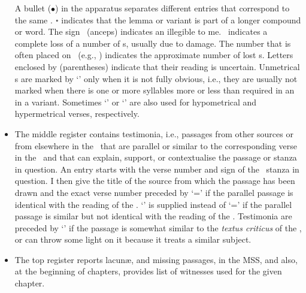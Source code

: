 \begin{itemize}
A bullet ($\bullet$) in the apparatus separates different entries that correspond to
the same .
{\devanagarifont ॰} indicates that the lemma or variant is part of a longer compound or word. 
The sign \lk\ (anceps) indicates an  illegible to me.
\lac\ indicates a complete loss of a number of s, usually due to damage.
The number that is often placed on \lac\ (e.g., ) indicates the approximate
number of lost s.
Letters enclosed by (parentheses) indicate that their reading is uncertain. 
Unmetrical s are marked by `\unmetr' only when it is not fully obvious,
i.e., they are usually not marked when there is one or more syllables more 
or less than required in an  in a variant.
Sometimes `\hypometr' or `\hypermetr' are also used for hypometrical and hypermetrical verses, respectively.


\item The middle register contains testimonia, i.e., passages from other sources
or from elsewhere in the \VSS\ that are parallel or similar to the
corresponding verse in the \VSS\ and that can explain, support, or
contextualise the passage or stanza in question.
An entry starts with the verse number and  sign of the \VSS\ stanza in question. %
I then give the title of the source from which the passage has been drawn
and the exact verse number preceded by `=' if the parallel
passage is identical with the reading of the \VSS. 
`\similar' is supplied instead of `=' if the parallel passage
is similar but not identical with the reading of the \VSS.
Testimonia are preceded by `\compare' if the passage is somewhat similar to the \textit{textus criticus} of the
\VSS, or can throw some light on it because it treats a similar subject. 

\item The top register reports lacun\ae{}, and missing passages, in the MSS, and also, at the beginning of
chapters, provides list of witnesses used for the given chapter.


\end{itemize}


